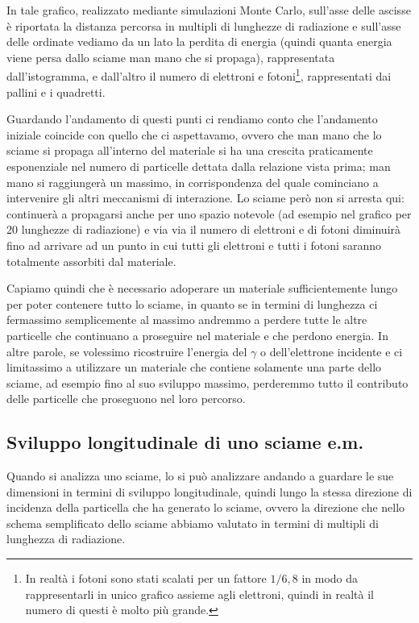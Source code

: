 In tale grafico, realizzato mediante simulazioni Monte Carlo, sull'asse delle ascisse è riportata la distanza percorsa in multipli di lunghezze di radiazione e sull'asse delle ordinate vediamo da un lato la perdita di energia (quindi quanta energia viene persa dallo sciame man mano che si propaga), rappresentata dall'istogramma, e dall'altro il numero di elettroni e fotoni\footnote{In realtà i fotoni sono stati scalati per un fattore $1/6,8$ in modo da rappresentarli in unico grafico assieme agli elettroni, quindi in realtà il numero di questi è molto più grande.}, rappresentati dai pallini e i quadretti.

Guardando l'andamento di questi punti ci rendiamo conto che l'andamento iniziale coincide con quello che ci aspettavamo, ovvero che man mano che lo sciame si propaga all'interno del materiale si ha una crescita praticamente esponenziale nel numero di particelle dettata dalla relazione vista prima; man mano si raggiungerà un massimo, in corrispondenza del quale cominciano a intervenire gli altri meccanismi di interazione. Lo sciame però non si arresta qui: continuerà a propagarsi anche per uno spazio notevole (ad esempio nel grafico per 20 lunghezze di radiazione) e via via il numero di elettroni e di fotoni diminuirà fino ad arrivare ad un punto in cui tutti gli elettroni e tutti i fotoni saranno totalmente assorbiti dal materiale.

Capiamo quindi che è necessario adoperare un materiale sufficientemente lungo per poter contenere tutto lo sciame, in quanto se in termini di lunghezza ci fermassimo semplicemente al massimo andremmo a perdere tutte le altre particelle che continuano a proseguire nel materiale e che perdono energia. In altre parole, se volessimo ricostruire l'energia del $\gamma$ o dell'elettrone incidente e ci limitassimo a utilizzare un materiale che contiene solamente una parte dello sciame, ad esempio fino al suo sviluppo massimo, perderemmo tutto il contributo delle particelle che proseguono nel loro percorso.

\subsection{Sviluppo longitudinale di uno sciame e.m.}

Quando si analizza uno sciame, lo si può analizzare andando a guardare le sue dimensioni in termini di sviluppo longitudinale, quindi lungo la stessa direzione di incidenza della particella che ha generato lo sciame, ovvero la direzione che nello schema semplificato dello sciame abbiamo valutato in termini di multipli di lunghezza di radiazione.

